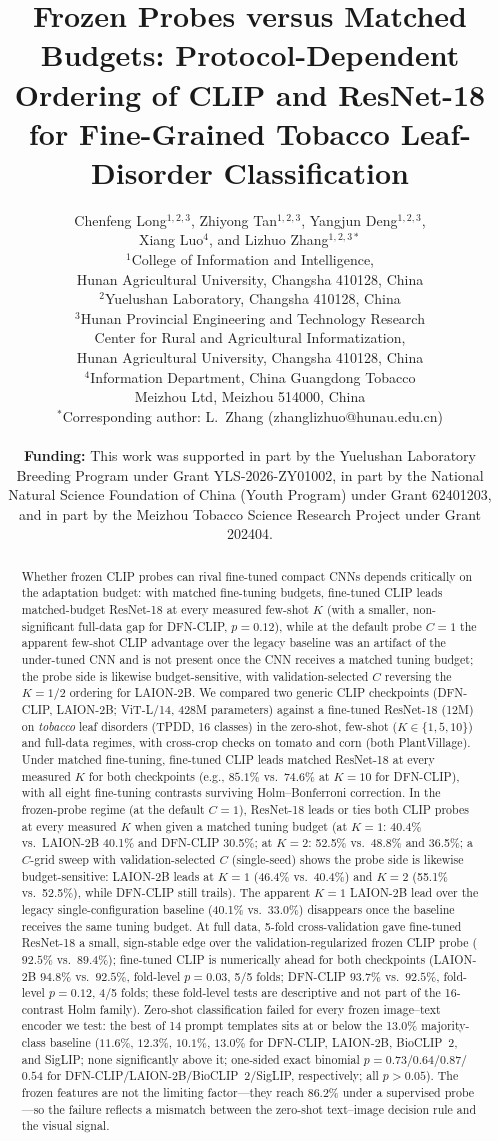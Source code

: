 \documentclass[10pt,a4paper]{article}
\title{Frozen Probes versus Matched Budgets: Protocol-Dependent Ordering of CLIP and ResNet-18 for Fine-Grained Tobacco Leaf-Disorder Classification}
\author{
Chenfeng Long$^{1,2,3}$, Zhiyong Tan$^{1,2,3}$, Yangjun Deng$^{1,2,3}$,\\ Xiang Luo$^{4}$, and Lizhuo Zhang$^{1,2,3*}$\\[6pt]
$^{1}$College of Information and Intelligence,\\
\hspace{1em}Hunan Agricultural University, Changsha 410128, China\\
$^{2}$Yuelushan Laboratory, Changsha 410128, China\\
$^{3}$Hunan Provincial Engineering and Technology Research\\
\hspace{1em}Center for Rural and Agricultural Informatization,\\
\hspace{1em}Hunan Agricultural University, Changsha 410128, China\\
$^{4}$Information Department, China Guangdong Tobacco\\
\hspace{1em}Meizhou Ltd, Meizhou 514000, China\\[4pt]
$^{*}$Corresponding author: L.~Zhang (zhanglizhuo@hunau.edu.cn)\\[4pt]
\parbox{\dimexpr\hsize-2\tabcolsep\relax}{\sloppy\small\textbf{Funding:} This work was supported in part by the Yuelushan Laboratory Breeding Program under Grant YLS-2026-ZY01002, in part by the National Natural Science Foundation of China (Youth Program) under Grant 62401203, and in part by the Meizhou Tobacco Science Research Project under Grant 202404.}
}
\date{}
\begin{document}
\maketitle

\begin{abstract}
Whether frozen CLIP probes can rival fine-tuned compact CNNs depends critically on the adaptation budget: with matched fine-tuning budgets, fine-tuned CLIP leads matched-budget ResNet-18 at every measured few-shot $K$ (with a smaller, non-significant full-data gap for DFN-CLIP, $p{=}0.12$), while at the default probe $C{=}1$ the apparent few-shot CLIP advantage over the legacy baseline was an artifact of the under-tuned CNN and is not present once the CNN receives a matched tuning budget; the probe side is likewise budget-sensitive, with validation-selected $C$ reversing the $K{=}1/2$ ordering for LAION-2B. We compared two generic CLIP checkpoints (DFN-CLIP, LAION-2B; ViT-L/14, 428M parameters) against a fine-tuned ResNet-18 (12M) on \emph{tobacco} leaf disorders (TPDD, 16 classes) in the zero-shot, few-shot ($K\in\{1,5,10\}$) and full-data regimes, with cross-crop checks on tomato and corn (both PlantVillage).
Under matched fine-tuning, fine-tuned CLIP leads matched ResNet-18 at every measured $K$ for both checkpoints (e.g., $85.1\%$ vs.\ $74.6\%$ at $K{=}10$ for DFN-CLIP), with all eight fine-tuning contrasts surviving Holm--Bonferroni correction. In the frozen-probe regime (at the default $C{=}1$), ResNet-18 leads or ties both CLIP probes at every measured $K$ when given a matched tuning budget (at $K{=}1$: 40.4\% vs.\ LAION-2B 40.1\% and DFN-CLIP 30.5\%; at $K{=}2$: 52.5\% vs.\ 48.8\% and 36.5\%; a $C$-grid sweep with validation-selected $C$ (single-seed) shows the probe side is likewise budget-sensitive: LAION-2B leads at $K{=}1$ (46.4\% vs.\ 40.4\%) and $K{=}2$ (55.1\% vs.\ 52.5\%), while DFN-CLIP still trails). The apparent $K{=}1$ LAION-2B lead over the legacy single-configuration baseline (40.1\% vs.\ 33.0\%) disappears once the baseline receives the same tuning budget. At full data, 5-fold cross-validation gave fine-tuned ResNet-18 a small, sign-stable edge over the validation-regularized frozen CLIP probe ($92.5\%$ vs.\ $89.4\%$); fine-tuned CLIP is numerically ahead for both checkpoints (LAION-2B $94.8\%$ vs.\ $92.5\%$, fold-level $p{=}0.03$, 5/5 folds; DFN-CLIP $93.7\%$ vs.\ $92.5\%$, fold-level $p{=}0.12$, 4/5 folds; these fold-level tests are descriptive and not part of the 16-contrast Holm family).
Zero-shot classification failed for every frozen image--text encoder we test: the best of 14 prompt templates sits at or below the 13.0\% majority-class baseline ($11.6\%$, $12.3\%$, $10.1\%$, $13.0\%$ for DFN-CLIP, LAION-2B, BioCLIP~2, and SigLIP; none significantly above it; one-sided exact binomial $p{=}0.73$/$0.64$/$0.87$/$0.54$ for DFN-CLIP/LAION-2B/BioCLIP~2/SigLIP, respectively; all $p>0.05$). The frozen features are not the limiting factor---they reach 86.2\% under a supervised probe---so the failure reflects a mismatch between the zero-shot text--image decision rule and the visual signal.

\end{abstract}
\end{document}
